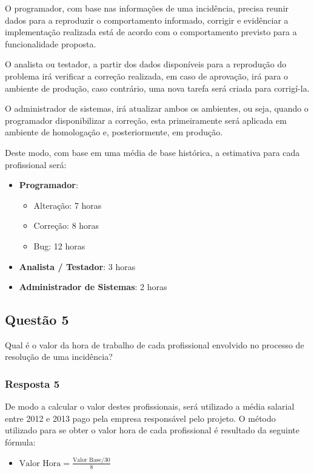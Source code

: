\documentclass[11pt, a4paper]{article}
\begin{document}
O programador, com base nas informações de uma incidência, precisa reunir dados para a reproduzir o comportamento informado, corrigir e evidênciar a implementação realizada está de acordo com o comportamento previsto para a funcionalidade proposta.

O analista ou testador, a partir dos dados disponíveis para a reprodução do problema irá verificar a correção realizada, em caso de aprovação, irá para o ambiente de produção, caso contrário, uma nova tarefa será criada para corrigí-la.

O administrador de sistemas, irá atualizar ambos os ambientes, ou seja, quando o programador disponibilizar a correção, esta primeiramente será aplicada em ambiente de homologação e, posteriormente, em produção.

Deste modo, com base em uma média de base histórica, a estimativa para cada profissional será:

\begin{itemize}
	\item \textbf{Programador}: 
		\begin{itemize}
			\item Alteração: 7 horas
			\item Correção: 8 horas
			\item Bug: 12 horas
		\end{itemize}
	\item \textbf{Analista / Testador}: 3 horas
	\item \textbf{Administrador de Sistemas}: 2 horas
\end{itemize}

\subsection{Questão 5}
Qual é o valor da hora de trabalho de cada profissional envolvido no processo de resolução de uma incidência?

\subsubsection{Resposta 5}
De modo a calcular o valor destes profissionais, será utilizado a média salarial entre 2012 e 2013 pago pela empresa responsável pelo projeto. O método utilizado para se obter o valor hora de cada profissional é resultado da seguinte fórmula: 

\begin{itemize}
  \item[] \textbf{$\text{Valor Hora}=\frac{\text{Valor Base} / 30}{8}$}
\end{itemize}
\end{document}
